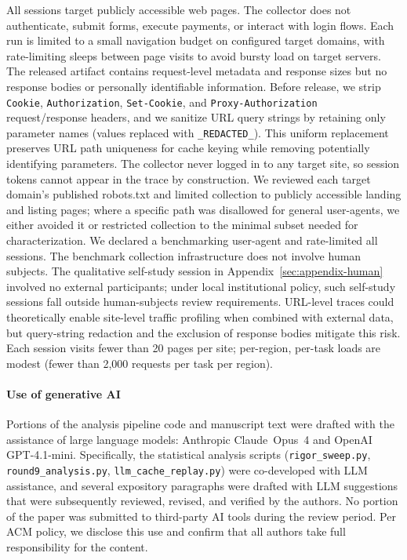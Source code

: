 \documentclass[10pt,sigconf,letterpaper,anonymous,nonacm]{acmart}
\begin{document}
All sessions target publicly accessible web pages.  The collector does
not authenticate, submit forms, execute payments, or interact with
login flows.  Each run is limited to a small navigation budget on
configured target domains, with rate-limiting sleeps between page
visits to avoid bursty load on target servers.  The released artifact
contains request-level metadata and response sizes but no response
bodies or personally identifiable information.  Before release, we
strip \texttt{Cookie}, \texttt{Autho\-riza\-tion}, \texttt{Set-\allowbreak Cookie},
and \texttt{Proxy-\allowbreak Autho\-riza\-tion} request/response headers, and we
sanitize URL query strings by retaining only parameter names
(values replaced with \texttt{\_REDACTED\_}).
This uniform replacement preserves URL path uniqueness for cache keying while removing potentially identifying parameters.  The collector never
logged in to any target site, so session tokens cannot appear in the
trace by construction.  We reviewed each target domain's published robots.txt and limited
collection to publicly accessible landing and listing pages; where a
specific path was disallowed for general user-agents, we either avoided
it or restricted collection to the minimal subset needed for
characterization.  We declared a benchmarking user-agent and rate-limited
all sessions.  The benchmark collection infrastructure does not involve human subjects.  The qualitative self-study session in Appendix~\ref{sec:appendix-human} involved no external participants; under local institutional policy, such self-study sessions fall outside human-subjects review requirements. URL-level traces could theoretically enable site-level traffic profiling when combined with external data, but query-string redaction and the exclusion of response bodies mitigate this risk.  Each session visits fewer than 20 pages per site; per-region, per-task loads are modest (fewer than 2{,}000 requests per task per region).

\paragraph{Use of generative AI}
Portions of the analysis pipeline code and manuscript text were
drafted with the assistance of large language models: Anthropic
Claude~Opus~4 and OpenAI GPT-4.1-mini.  Specifically, the statistical
analysis scripts (\texttt{rigor\_sweep.py}, \texttt{round9\_analysis.py},
\texttt{llm\_cache\_replay.py}) were co-developed with LLM assistance, and
several expository paragraphs were drafted with LLM suggestions that
were subsequently reviewed, revised, and verified by the authors.
No portion of the paper was submitted to third-party AI tools during
the review period.  Per ACM policy, we disclose this use and confirm
that all authors take full responsibility for the content.
\end{document}
